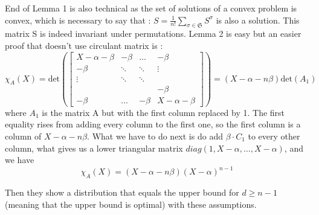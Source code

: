 \documentclass{amsart}
\begin{document}
End of Lemma 1 is also technical as the set of solutions of a convex problem is convex, which is necessary to say that : $S=\frac{1}{n!}\sum_{\sigma\in\mathfrak{S}}S^\sigma$ is also a solution. This matrix S is indeed invariant under permutations. Lemma 2 is easy but an easier proof that doesn't use circulant matrix is : 
$$\chi_A(X)=\text{det}(\begin{bmatrix}
    X- \alpha - \beta & -\beta&\hdots&-\beta \\
    -\beta & \ddots &\ddots&\vdots \\
    \vdots &\ddots &\ddots&   \\
    &&&-\beta\\
    -\beta&\hdots&-\beta&X-\alpha-\beta
\end{bmatrix})=(X-\alpha-n\beta)\text{det}(A_1)$$
where $A_1$ is the matrix A but with the first column replaced by 1. The first equality rises from adding every column to the first one, so the first column is a column of $X-\alpha-n\beta$. What we have to do next is do add $\beta\cdot C_1$ to every other column, what gives us a lower triangular matrix $diag(1,X-\alpha,...,X-\alpha)$, and we have $$
\chi_A(X)=(X-\alpha-n\beta)(X-\alpha)^{n-1}$$

Then they show a distribution that equals the upper bound for $d\geq n-1$(meaning that the upper bound is optimal) with these assumptions.
\end{document}
